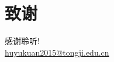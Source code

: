\documentclass{beamer}
\begin{document}
\section*{致谢}
\begin{frame}
\begin{center}
	\Large 感谢聆听!\\[0.5em]
	\small\textcolor[rgb]{1,0.078,0.576}{\url{huyukuan2015@tongji.edu.cn}}
\end{center}
\end{frame}
\end{document}
